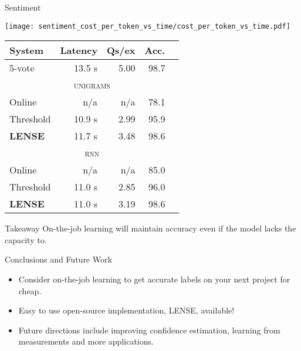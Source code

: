 \begin{block}{Sentiment}
    \begin{minipage}[t]{.43\columnwidth}
      \colorbox{white}{
      \texttt{[image: sentiment\_cost\_per\_token\_vs\_time/cost\_per\_token\_vs\_time.pdf]}
      }
    \end{minipage}
    \quad
    \begin{minipage}[t]{.45\columnwidth}
      \begin{tabular}[b]{l  r  r  r  r}
          \textbf{System} & \textbf{Latency} & \textbf{Qs/ex} & \textbf{Acc.} \\ \hline
          5-vote & 13.5 s & 5.00 & 98.7 \\ %
          \multicolumn{5}{c}{\textsc{unigrams}} \\ \hline
          Online & n/a & n/a & 78.1 \\ %
          Threshold & 10.9 s & 2.99 & 95.9 \\ %
          \textbf{LENSE} & 11.7 s & 3.48 & 98.6 \\ %
          \multicolumn{5}{c}{\textsc{rnn}} \\ \hline
          Online & n/a & n/a & 85.0 \\ %
          Threshold & 11.0 s & 2.85 & 96.0 \\ %
          \textbf{LENSE} & 11.0 s & 3.19 & 98.6 \\%
      \end{tabular}
    \end{minipage}%

  \begin{exampleblock}{Takeaway}
      On-the-job learning will maintain accuracy even if the model lacks the capacity to.
  \end{exampleblock}
\end{block}
\vfill

\begin{block}{Conclusions and Future Work}
  \begin{itemize}
    \item Consider on-the-job learning to get accurate labels on your
      next project for cheap. 
    \item Easy to use open-source implementation, LENSE, available!
    \item Future directions include improving confidence estimation, 
      learning from measurements and more applications.
  \end{itemize}
\end{block}
\vfill

